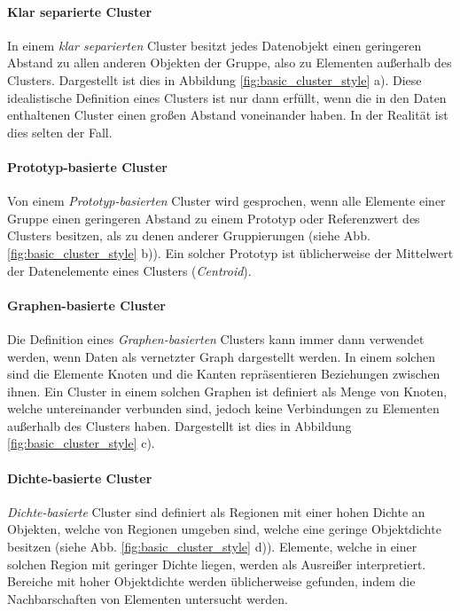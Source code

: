 \paragraph{Klar separierte Cluster}
In einem \textit{klar separierten} Cluster besitzt jedes Datenobjekt einen geringeren Abstand zu allen anderen
Objekten der Gruppe, also zu Elementen außerhalb des Clusters.
Dargestellt ist dies in Abbildung \ref{fig:basic_cluster_style} a). Diese idealistische Definition eines
Clusters ist nur dann erfüllt, wenn die in den Daten enthaltenen Cluster einen großen Abstand voneinander haben.
In der Realität ist dies selten der Fall.

\paragraph{Prototyp-basierte Cluster}
Von einem \textit{Prototyp-basierten} Cluster wird gesprochen, wenn alle Elemente einer Gruppe einen
geringeren Abstand zu einem Prototyp oder Referenzwert des Clusters besitzen, als zu denen anderer
Gruppierungen (siehe Abb. \ref{fig:basic_cluster_style} b)).
Ein solcher Prototyp ist üblicherweise der Mittelwert der Datenelemente eines Clusters (\textit{Centroid}).

\paragraph{Graphen-basierte Cluster}
Die Definition eines \textit{Graphen-basierten} Clusters kann immer dann verwendet werden, wenn Daten
als vernetzter Graph dargestellt werden. In einem solchen sind die Elemente Knoten und die Kanten
repräsentieren Beziehungen zwischen ihnen. Ein Cluster in einem solchen Graphen ist definiert als Menge von
Knoten, welche untereinander verbunden sind, jedoch keine Verbindungen zu Elementen außerhalb des Clusters haben.
Dargestellt ist dies in Abbildung \ref{fig:basic_cluster_style} c).

\paragraph{Dichte-basierte Cluster}
\textit{Dichte-basierte} Cluster sind definiert als Regionen mit einer hohen Dichte an Objekten, welche von
Regionen umgeben sind, welche eine geringe Objektdichte besitzen (siehe Abb. \ref{fig:basic_cluster_style} d)).
Elemente, welche in einer solchen Region mit geringer Dichte liegen, werden als Ausreißer interpretiert.
Bereiche mit hoher Objektdichte werden üblicherweise gefunden, indem die Nachbarschaften von Elementen untersucht werden.

